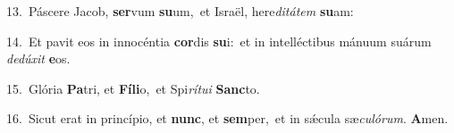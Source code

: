 {\numbfont\textcolor{\numbcolor}{13.}}~Páscere Jacob, \textbf{ser}\-vum \textbf{su}\-um,~\star et Israël, here\-\textit{di}\-\textit{tá}\textit{tem} \textbf{su}\-am:\par
{\numbfont\textcolor{\numbcolor}{14.}}~Et pavit eos in innocéntia \textbf{cor}\-dis \textbf{su}\-i:~\star et in intelléctibus mánuum suárum \textit{de}\-\textit{dú}\textit{xit} \textbf{e}\-os.\par
{\numbfont\textcolor{\numbcolor}{15.}}~Glória \textbf{Pa}\-tri, et \textbf{Fí}\-\textbf{li}o,~\star et Spi\-\textit{rí}\-\textit{tu}\textit{i} \textbf{Sanc}\-to.\par
{\numbfont\textcolor{\numbcolor}{16.}}~Sicut erat in princípio, et \textbf{nunc}\-, et \textbf{sem}\-per,~\star et in sǽcula sæ\-\textit{cu}\-\textit{ló}\textit{rum}. \textbf{A}\-men.\par
